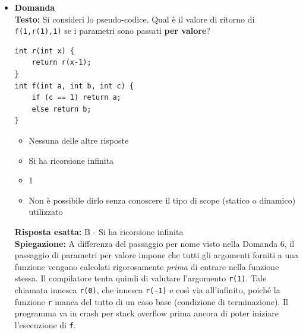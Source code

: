 \documentclass[12pt, a4paper]{article}
\newcounter{domandateoria}
\begin{document}
\begin{itemize}
    \item {}\textbf{Domanda \thedomandateoria} \\
    \textbf{Testo:} Si consideri lo pseudo-codice. Qual è il valore di ritorno di \texttt{f(1,r(1),1)} se i parametri sono passati \textbf{per valore}?
\begin{verbatim}
int r(int x) {
    return r(x-1);
}
int f(int a, int b, int c) {
    if (c == 1) return a;
    else return b;
}
\end{verbatim}
    \begin{itemize}
        \item[A)] Nessuna delle altre risposte
        \item[B)] Si ha ricorsione infinita
        \item[C)] 1
        \item[D)] Non è possibile dirlo senza conoscere il tipo di scope (statico o dinamico) utilizzato
    \end{itemize}
    \textbf{Risposta esatta:} B - Si ha ricorsione infinita \\
    \textbf{Spiegazione:} A differenza del passaggio per nome visto nella Domanda 6, il passaggio di parametri per valore impone che tutti gli argomenti forniti a una funzione vengano calcolati rigorosamente \textit{prima} di entrare nella funzione stessa. Il compilatore tenta quindi di valutare l'argomento \texttt{r(1)}. Tale chiamata innesca \texttt{r(0)}, che innesca \texttt{r(-1)} e così via all'infinito, poiché la funzione \texttt{r} manca del tutto di un caso base (condizione di terminazione). Il programma va in crash per stack overflow prima ancora di poter iniziare l'esecuzione di \texttt{f}.
    \vspace{0.3cm}


\end{itemize}
\end{document}
